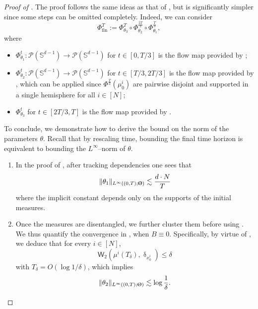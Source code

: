 \documentclass[a4paper,11pt]{article}
\theoremstyle{plain}
\renewcommand{\S}{\mathbb{S}^{d-1}}
\newcommand{\bB}{\bm{\mathit{B}}}
\renewcommand{\leq}{\leqslant}
\numberwithin{equation}{section}
\begin{document}
\begin{proof}[Proof of ]

The proof follows the same ideas as that of , but is significantly simpler since some steps can be omitted completely. Indeed, we can consider
\begin{equation*}
    \Phi^T_{\text{fin}}:=\Phi^{T}_{\theta_3}\circ\Phi^{\frac{2T}{3}}_{\theta_2}\circ\Phi^{\frac{T}{3}}_{\theta_1},
\end{equation*}
where 
\begin{itemize}
    \item $\Phi^t_{\theta_1}:\mathscr{P}(\S)\to\mathscr{P}(\S)$ for $t\in[0,T/3]$ is the flow map provided by ;
    \item $\Phi^{t}_{\theta_2}:\mathscr{P}(\S)\to\mathscr{P}(\S)$ for $t\in[T/3, 2T/3]$ is the flow map provided by , which can be applied since $\Phi^{\frac{T}{3}}(\mu_0^i)$ are pairwise disjoint and supported in a single hemisphere for all $i\in[N]$;
    \item $\Phi^t_{\theta_3}$ for $t\in[2T/3,T]$ is the flow map provided by .
\end{itemize}

To conclude, we demonstrate how to derive the bound on the norm of the parameters $\theta$. Recall that by rescaling time, bounding the final time horizon is equivalent to bounding the $L^\infty$--norm of $\theta$.

\begin{enumerate}
    \item In the proof of , after tracking dependencies one sees that
    \begin{equation*}
        \|\theta_1\|_{L^\infty((0,T);\Uptheta)}\lesssim \frac{ d\cdot N}{T}
    \end{equation*}
    where the implicit constant depends only on the supports of the initial measures.
    
    \item Once the measures are disentangled, we further cluster them before using . 
    We thus quantify the convergence in , when $\bB\equiv0$. Specifically, by virtue of , we deduce that for every $i\in[N]$,
    \begin{equation*}
        \mathsf{W}_2\left(\mu^i(T_\delta),\updelta_{x_0^i}\right)\leq \delta
    \end{equation*}
    with $T_\delta=O(\log1/\delta)$, which implies 
\begin{equation*}
    \|\theta_2\|_{L^\infty((0,T);\Uptheta)}\lesssim \log\frac{1}{\delta}.
\end{equation*}


\end{enumerate}
\end{proof}
\end{document}
